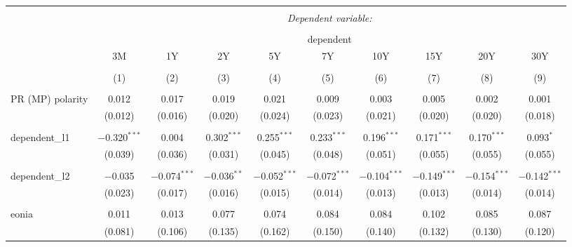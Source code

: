 


\begin{table}[!htbp] \centering 
  \caption{} 
  \label{} 
  \begin{adjustbox}{width=1.35\textwidth}
\begin{tabular}{@{\extracolsep{5pt}}lccccccccc} 
\\[-1.8ex]\hline 
\hline \\[-1.8ex] 
 & \multicolumn{9}{c}{\textit{Dependent variable:}} \\ 
\cline{2-10} 
\\[-1.8ex] & \multicolumn{9}{c}{dependent} \\ 
 & 3M & 1Y & 2Y & 5Y & 7Y & 10Y & 15Y & 20Y & 30Y \\ 
\\[-1.8ex] & (1) & (2) & (3) & (4) & (5) & (6) & (7) & (8) & (9)\\ 
\hline \\[-1.8ex] 
 PR (MP) polarity & 0.012 & 0.017 & 0.019 & 0.021 & 0.009 & 0.003 & 0.005 & 0.002 & 0.001 \\ 
  & (0.012) & (0.016) & (0.020) & (0.024) & (0.023) & (0.021) & (0.020) & (0.020) & (0.018) \\ 
  & & & & & & & & & \\ 
 dependent\_l1 & $-$0.320$^{***}$ & 0.004 & 0.302$^{***}$ & 0.255$^{***}$ & 0.233$^{***}$ & 0.196$^{***}$ & 0.171$^{***}$ & 0.170$^{***}$ & 0.093$^{*}$ \\ 
  & (0.039) & (0.036) & (0.031) & (0.045) & (0.048) & (0.051) & (0.055) & (0.055) & (0.055) \\ 
  & & & & & & & & & \\ 
 dependent\_l2 & $-$0.035 & $-$0.074$^{***}$ & $-$0.036$^{**}$ & $-$0.052$^{***}$ & $-$0.072$^{***}$ & $-$0.104$^{***}$ & $-$0.149$^{***}$ & $-$0.154$^{***}$ & $-$0.142$^{***}$ \\ 
  & (0.023) & (0.017) & (0.016) & (0.015) & (0.014) & (0.013) & (0.013) & (0.014) & (0.014) \\ 
  & & & & & & & & & \\ 
 eonia & 0.011 & 0.013 & 0.077 & 0.074 & 0.084 & 0.084 & 0.102 & 0.085 & 0.087 \\ 
  & (0.081) & (0.106) & (0.135) & (0.162) & (0.150) & (0.140) & (0.132) & (0.130) & (0.120) \\ 

\end{tabular}
\end{adjustbox}
\end{table}
